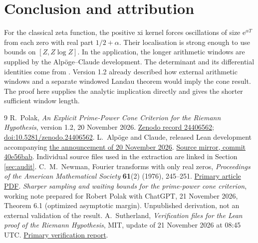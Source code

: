 \documentclass[11pt,a4paper]{article}
\theoremstyle{remark}\newtheorem{remark}[theorem]{Remark}
\newcommand{\e}{\mathrm e}
\begin{document}
\section{Conclusion and attribution}
For the classical zeta function, the positive xi kernel forces
oscillations of size \(\e^{\alpha T}\) from each zero with real part
\(1/2+\alpha\). Their localisation is strong enough to use bounds
on \([Z,Z\log Z]\). In the application, the longer arithmetic
windows are supplied by the Alp\"oge--Claude development. The
determinant and its differential identities come from \cite{Polak}.
Version 1.2 already described how external arithmetic windows and
a separate windowed Landau theorem would imply the cone result.
The proof here supplies the analytic implication directly and gives
the shorter sufficient window length.

\begin{thebibliography}{9}
R.~Polak, \emph{An Explicit Prime-Power Cone Criterion for the
Riemann Hypothesis}, version 1.2, 20 November 2026.
\href{https://zenodo.org/records/24406562}{Zenodo record 24406562};
\href{https://doi.org/10.5281/zenodo.24406562}{doi:10.5281/zenodo.24406562}.
L.~Alp\"oge and Claude, released Lean development accompanying
\href{https://alpo.ge/remark.pdf}{the announcement of 20 November 2026}.
\href{https://github.com/Deicyde/riemann-hypothesis/tree/40e56bab}{Source mirror, commit 40e56bab}.
Individual source files used in the extraction are linked in
Section \ref{sec:audit}.
C.~M.~Newman, Fourier transforms with only real zeros,
\emph{Proceedings of the American Mathematical Society}
\textbf{61}(2) (1976), 245--251.
\href{https://sites.math.northwestern.edu/~auffing/papers/Newman.pdf}{Primary article PDF}.
\emph{Sharper sampling and waiting bounds for the prime-power cone criterion},
working note prepared for Robert Polak with ChatGPT,
21 November 2026, Theorem 6.1 (optimized asymptotic margin).
Unpublished derivation, not an external validation of the result.
A.~Sutherland, \emph{Verification files for the Lean proof of the
Riemann Hypothesis}, MIT, update of 21 November 2026 at 08:45 UTC.
\href{https://math.mit.edu/~drew/grh/}{Primary verification report}.
\end{thebibliography}
\end{document}
